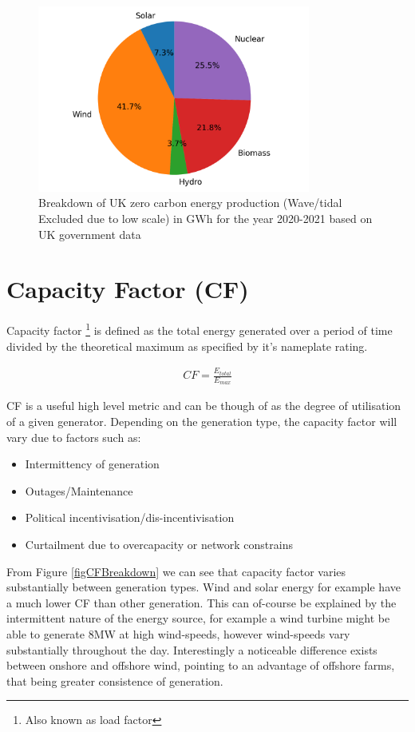 \documentclass[11pt]{article}
\numberwithin{equation}{section}
\begin{document}
\begin{figure}[H]
\centering
\includegraphics[width=0.8\textwidth]{./.ob-jupyter/9d5f54f66e0860cfcadd03202a7835f8eee375c2.png}
\caption{\label{figPie2020CumGen}Breakdown of UK zero carbon energy production (Wave/tidal Excluded due to low scale) in GWh for the year 2020-2021 based on UK government data \cite{RenewableElecricityCap}}
\end{figure}

\section{Capacity Factor (CF) \label{secCF}}
\label{sec:org9329733}
Capacity factor \footnote{Also known as load factor} is defined as the total energy generated over a period of time divided by the theoretical maximum as specified by it's nameplate rating.

\begin{align}
\label{eqCFDeff}
CF= \frac{E_{total}}{E_{max}}
\end{align}

CF is a useful high level metric and can be though of as the degree of utilisation of a given generator. Depending on the generation type, the capacity factor will vary due to factors such as:
\begin{itemize}
\item Intermittency of generation
\item Outages/Maintenance
\item Political incentivisation/dis-incentivisation
\item Curtailment due to overcapacity or network constrains
\end{itemize}

From Figure \ref{figCFBreakdown} we can see that capacity factor varies substantially between generation types. Wind and solar energy for example have a much lower CF than other generation. This can of-course be explained by the intermittent nature of the energy source, for example a wind turbine might be able to generate 8MW at high wind-speeds, however wind-speeds vary substantially throughout the day. Interestingly a noticeable difference exists between onshore and offshore wind, pointing to an advantage of offshore farms, that being greater consistence of generation.
\end{document}
